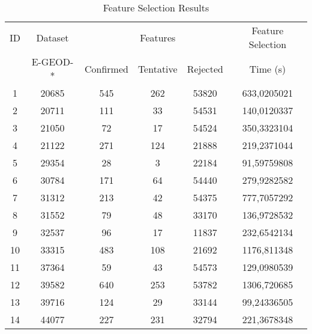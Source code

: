 \begin{table}[ht]
    \centering
    \caption{Feature Selection Results}
    \label{tab:feature_selection_results}
    \begin{tabular}{cccccc}
        \toprule
        ID & Dataset & & Features & & Feature Selection \\
        & E-GEOD-* & Confirmed & Tentative  & Rejected & Time (s) \\
        \midrule
        1  & 20685 & 545  & 262 & 53820 & 633,0205021 \\
        2  & 20711 & 111  & 33  & 54531 & 140,0120337 \\
        3  & 21050 & 72   & 17  & 54524 & 350,3323104 \\
        4  & 21122 & 271  & 124 & 21888 & 219,2371044 \\
        5  & 29354 & 28   & 3   & 22184 & 91,59759808 \\
        6  & 30784 & 171  & 64  & 54440 & 279,9282582 \\
        7  & 31312 & 213  & 42  & 54375 & 777,7057292 \\
        8  & 31552 & 79   & 48  & 33170 & 136,9728532 \\
        9  & 32537 & 96   & 17  & 11837 & 232,6542134 \\
        10 & 33315 & 483  & 108 & 21692 & 1176,811348  \\
        11 & 37364 & 59   & 43  & 54573 & 129,0980539  \\
        12 & 39582 & 640  & 253 & 53782 & 1306,720685  \\
        13 & 39716 & 124  & 29  & 33144 & 99,24336505  \\
        14 & 44077 & 227  & 231 & 32794 & 221,3678348  \\
        \bottomrule
    \end{tabular}
\end{table}

